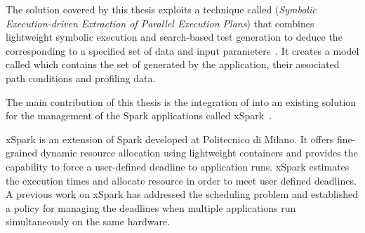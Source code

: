 



The solution covered by this thesis exploits a technique called \dSymb (\textit{Symbolic Execution-driven Extraction of Parallel Execution Plans}) that combines lightweight symbolic execution and search-based test generation to deduce the \plan corresponding to a specified set of data and input parameters~\cite{Baresi-Quattrocchi-Denaro:2019}. It creates a model called \model which contains the set of \plans generated by the application, their associated path conditions and profiling data. 


The main contribution of this thesis is the integration of \dSymb into an existing solution for the management of the Spark applications called xSpark~\cite{xsparkreport, Quattrocchi2018}.

xSpark is an extension of Spark developed at Politecnico di Milano. It offers fine-grained dynamic resource allocation using lightweight containers and provides the capability to force a user-defined deadline to application runs. xSpark estimates the execution times and allocate resource in order to meet user defined deadlines. A previous work on xSpark has addressed the scheduling problem and established a policy for managing the deadlines when multiple applications run simultaneously on the same hardware.

